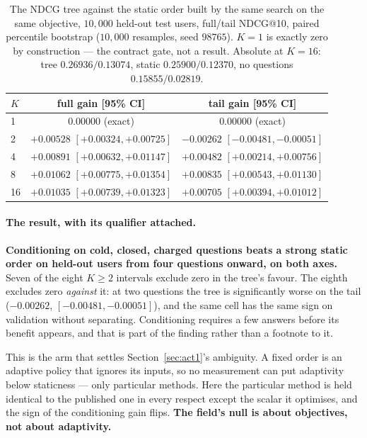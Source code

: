 \documentclass[11pt]{article}
\begin{document}
\begin{table}[t]
\centering
\caption{The NDCG tree against the static order built by the same search on the same objective,
$10{,}000$ held-out test users, full/tail NDCG@10, paired percentile bootstrap ($10{,}000$ resamples,
seed $98765$). $K{=}1$ is exactly zero by construction --- the contract gate, not a result.
Absolute at $K{=}16$: tree $0.26936/0.13074$, static $0.25900/0.12370$, no questions
$0.15855/0.02819$.}
\label{tab:tree}
\small
\begin{tabular}{lcc}
\toprule
$K$ & full gain [95\% CI] & tail gain [95\% CI] \\
\midrule
1 & $0.00000$ (exact) & $0.00000$ (exact) \\
2 & $+0.00528$ $[+0.00324,+0.00725]$ & $\mathbf{-0.00262}$ $[-0.00481,-0.00051]$ \\
4 & $+0.00891$ $[+0.00632,+0.01147]$ & $+0.00482$ $[+0.00214,+0.00756]$ \\
8 & $+0.01062$ $[+0.00775,+0.01354]$ & $+0.00835$ $[+0.00543,+0.01130]$ \\
16 & $+0.01035$ $[+0.00739,+0.01323]$ & $+0.00705$ $[+0.00394,+0.01012]$ \\
\bottomrule
\end{tabular}
\end{table}

\paragraph{The result, with its qualifier attached.} \textbf{Conditioning on cold, closed, charged
questions beats a strong static order on held-out users from four questions onward, on both axes.}
Seven of the eight $K\ge2$ intervals exclude zero in the tree's favour. The eighth excludes zero
\emph{against} it: at two questions the tree is significantly worse on the tail
($-0.00262$, $[-0.00481,-0.00051]$), and the same cell has the same sign on validation without
separating. Conditioning requires a few answers before its benefit appears, and that is part of the finding
rather than a footnote to it.

This is the arm that settles Section~\ref{sec:act1}'s ambiguity. A fixed order is an adaptive policy that ignores its
inputs, so no measurement can put adaptivity below staticness --- only particular methods. Here the
particular method is held identical to the published one in every respect except the scalar it
optimises, and the sign of the conditioning gain flips. \textbf{The field's null is about objectives,
not about adaptivity.}
\end{document}
